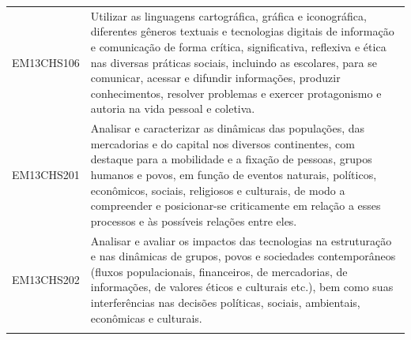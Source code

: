 \documentclass[12pt]{extarticle}
\begin{document}
\begin{longtable}{ll}
EM13CHS106 & Utilizar as linguagens cartográfica, gráfica e iconográfica, diferentes gêneros textuais e tecnologias digitais de informação e comunicação de forma crítica, significativa, reflexiva e ética nas diversas práticas sociais, incluindo as escolares, para se comunicar, acessar e difundir informações, produzir conhecimentos, resolver problemas e exercer protagonismo e autoria na vida pessoal e coletiva.                                                                                                                                                                                                                                                                                                                                                                                                      \\
\rowcolor[HTML]{E0F7FA} 
EM13CHS201 & Analisar e caracterizar as dinâmicas das populações, das mercadorias e do capital nos diversos continentes, com destaque para a mobilidade e a fixação de pessoas, grupos humanos e povos, em função de eventos naturais, políticos, econômicos, sociais, religiosos e culturais, de modo a compreender e posicionar-se criticamente em relação a esses processos e às possíveis relações entre eles.                                                                                                                                                                                                                                                                                                                                                                                                                 \\
\rowcolor[HTML]{FFF} 
EM13CHS202 & Analisar e avaliar os impactos das tecnologias na estruturação e nas dinâmicas de grupos, povos e sociedades contemporâneos (fluxos populacionais, financeiros, de mercadorias, de informações, de valores éticos e culturais etc.), bem como suas interferências nas decisões políticas, sociais, ambientais, econômicas e culturais.                                                                                                                                                                                                                                                                                                                                                                                                                                                                                \\
\rowcolor[HTML]{E0F7FA} 

\end{longtable}
\end{document}
